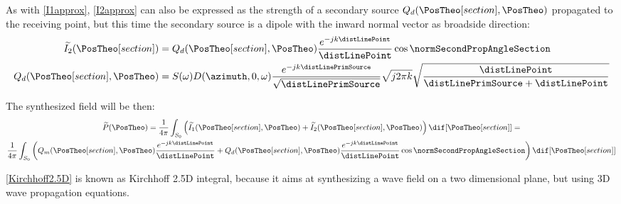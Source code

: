 As with \autoref{I1approx}, \autoref{I2approx} can also be expressed as the strength of a secondary source $Q_d(\PosTheo[section], \PosTheo)$ propagated to the receiving point, but this time the secondary source is a dipole with the inward normal vector as broadside direction:
\begin{equation}
\begin{aligned}
\widetilde{I_2}(\PosTheo[section]) &= Q_d(\PosTheo[section], \PosTheo) \frac{e^{-jk\distLinePoint}}{\distLinePoint} \cos\normSecondPropAngleSection \\
Q_d(\PosTheo[section], \PosTheo) &= S(\omega) D(\azimuth, 0, \omega) \frac{e^{-jk\distLinePrimSource}}{\sqrt{\distLinePrimSource}} \sqrt{j2\pi k} \sqrt{\frac{\distLinePoint}{\distLinePrimSource + \distLinePoint}}
\end{aligned}
\end{equation}

The synthesized field will be then:
\begin{multline}
	\widetilde{P}(\PosTheo) = \frac{1}{4\pi} \int_{S_0} \left( \widetilde{I_{1}}(\PosTheo[section], \PosTheo) + \widetilde{I_2}(\PosTheo[section], \PosTheo) \right)
	\dif[\PosTheo[section]] = \\ \frac{1}{4\pi} \int_{S_0} \left( Q_m(\PosTheo[section], \PosTheo) \frac{e^{-jk\distLinePoint}}{\distLinePoint} + Q_d(\PosTheo[section], \PosTheo) \frac{e^{-jk\distLinePoint}}{\distLinePoint} \cos\normSecondPropAngleSection \right)
	\dif[\PosTheo[section]]
	\label{Kirchhoff2.5D}
\end{multline} 

\autoref{Kirchhoff2.5D} is known as Kirchhoff 2.5D integral, because it aims at synthesizing a wave field on a two dimensional plane, but using 3D wave propagation equations.


